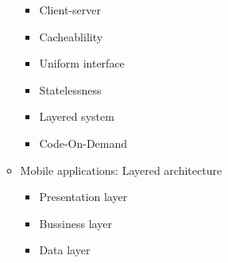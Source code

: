 \documentclass[12pt,openany]{book}
\begin{document}
\begin{itemize}
\begin{itemize}
        \begin{itemize}
            \item Client-server
            \item Cacheablility
            \item Uniform interface
            \item Statelessness
            \item Layered system
            \item Code-On-Demand
        \end{itemize}
        \item Mobile applications: Layered architecture
        \begin{itemize}
            \item Presentation layer
            \item Bussiness layer
            \item Data layer
        \end{itemize}
    \end{itemize}
\end{itemize}
\end{document}
